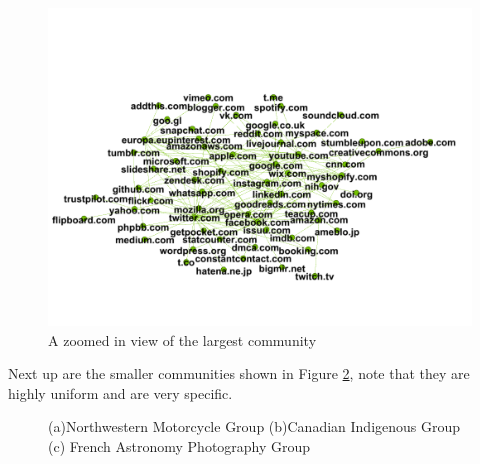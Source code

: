\documentclass[conference]{IEEEtran}
\begin{document}
\begin{figure}[htbp]
 \centerline{\includegraphics[width=\columnwidth]{figs/google.png}}
 \caption{A zoomed in view of the largest community}
 \label{fig:tech}
\end{figure}
Next up are the smaller communities shown in Figure \ref{fig:small groups}, 
note that they are highly uniform and are very specific.

\begin{figure}
    \centering
    \caption{(a)Northwestern Motorcycle Group (b)Canadian Indigenous Group (c) French Astronomy Photography Group}
    \label{fig:small groups}
\end{figure}
\end{document}
